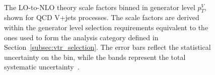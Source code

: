   \begin{figure}[htbp]
    \centering
         \\
    \caption{The LO-to-NLO theory scale factors binned in generator level $p_T^V$, shown for QCD V+jets processes.
            The scale factors are derived within the generator level selection requirements equivalent to the ones used to form the analysis category defined in Section~\ref{subsec:vtr_selection}. The error bars reflect the statistical uncertainty on the bin, while the bands represent the total systematic uncertainty~\cite{note:AN_19_257}.}
    \label{fig:nlo-kfactors-w_n_z-vbf-vtr}
\end{figure}
